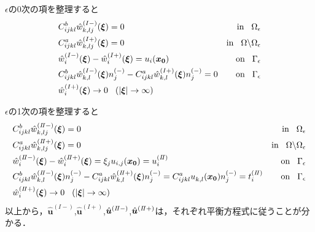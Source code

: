 $\epsilon$の0次の項を整理すると
\begin{align}
&C_{ijkl}^{b} \hat{w}^{(I-)}_{k,lj}(\bm{\xi})=0&\text{in}\hspace{0.3cm}\Omega_{\epsilon}
\label{eq:GovDisturIn1}
\\
&C_{ijkl}^{a} \hat{w}^{(I+)}_{k,lj}(\bm{\xi})=0&\text{in}\hspace{0.3cm}\Omega\backslash\Omega_{\epsilon}
\label{eq:GovDisturOut1}
\\
&\hat{w}_{i}^{(I-)}(\bm{\xi})-\hat{w}_{i}^{(I+)}(\bm{\xi})=u_{i}(\bm{x_0}) &\text{on}\hspace{0.3cm}\Gamma_{\epsilon}
\label{eq:GovDisturUBC1}
\\
&C_{ijkl}^{b}\hat{w}_{k,l}^{(I-)}(\bm{\xi})n_{j}^{(-)}
-C_{ijkl}^{a}\hat{w}_{k,l}^{(I+)}(\bm{\xi})n_{j}^{(-)}=0 &\text{on}\hspace{0.3cm}\Gamma_{\epsilon}
\label{eq:GovDisturSBC1}
\\
&\hat{w}_{i}^{(I+)}(\bm{\xi})\rightarrow 0 \hspace{0.3cm} (|\bm{\xi}|\rightarrow \infty)
\label{eq:GovDisturInftyBC1}
\end{align}

$\epsilon$の1次の項を整理すると
\begin{align}
&C_{ijkl}^{b} \hat{w}^{(I\hspace{-.15em}I-)}_{k,lj}(\bm{\xi})=0
&\text{in}\hspace{0.3cm}\Omega_{\epsilon}
\label{eq:GovDisturIn2}
\\
&C_{ijkl}^{a} \hat{w}^{(I\hspace{-.15em}I+)}_{k,lj}(\bm{\xi})=0
&\text{in}\hspace{0.3cm}\Omega\backslash\Omega_{\epsilon}
\label{eq:GovDisturOut2}
\\
&\hat{w}_{i}^{(I\hspace{-.15em}I-)}(\bm{\xi})
-\hat{w}_{i}^{(I\hspace{-.15em}I+)}(\bm{\xi})= \xi_j u_{i,j}(\bm{x_0})=u_{i}^{(I\hspace{-.15em}I)} &\text{on}\hspace{0.3cm}\Gamma_{\epsilon}
\label{eq:GovDisturUBC2}
\\
&C_{ijkl}^{b}\hat{w}_{k,l}^{(I\hspace{-.15em}I-)}(\bm{\xi})n_{j}^{(-)}
-C_{ijkl}^{a}\hat{w}_{k,l}^{(I\hspace{-.15em}I+)}(\bm{\xi})n_{j}^{(-)}
=C_{ijkl}^{a} u_{k,l}^{}(\bm{x_0})n_{j}^{(-)}=t_{i}^{(I\hspace{-.15em}I)} &\text{on}\hspace{0.3cm}\Gamma_{\epsilon}
\label{eq:GovDisturSBC2}
\\
&\hat{w}_{i}^{(I\hspace{-.15em}I+)}(\bm{\xi})\rightarrow 0 \hspace{0.3cm} (|\bm{\xi}|\rightarrow \infty)
\label{eq:GovDisturInftyBC2}
\end{align}
以上から，$\hat{\bm{u}}^{(I-)}$,$\hat{\bm{u}}^{(I+)}$,$\hat{\bm{u}}^{(I\hspace{-.15em}I-)}$,$\hat{\bm{u}}^{(I\hspace{-.15em}I+)}$は，それぞれ平衡方程式に従うことが分かる．

\newpage
